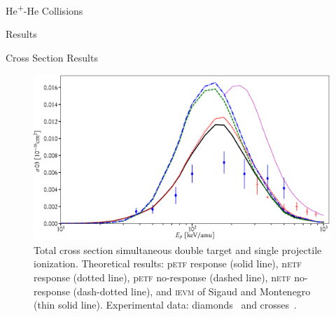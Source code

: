 \documentclass[a5paper, 9 pt]{extreport}
\begin{document}
\begin{chapter}{\texorpdfstring{He\textsuperscript{+}}{He+}-He Collisions \label{chap:hephe}}
\begin{section}{Results \label{sec:hephe-disc}}
\begin{subsection}{Cross Section Results \label{sec:hephe-res}}
         \begin{figure}[t]
            \centering
            \includegraphics[width = \linewidth]{./images/hephe-cross/HepHe-003.eps}
            \caption[Total cross section simultaneous double target and single projectile ionization in
                     He\textsuperscript{+}-He collisions.]
                    {Total cross section simultaneous double target and single projectile ionization.
                     Theoretical results: p\textsc{etf} response (solid line), n\textsc{etf} response
                                          (dotted line), p\textsc{etf} no-response (dashed line),
                                          n\textsc{etf} no-response (dash-dotted line), and
                                          \textsc{ievm} of Sigaud and Montenegro~\cite{SM-03} (thin
                                          solid line).
                     Experimental data: diamonds~\cite{Dub-89} and crosses~\cite{SSMSM-11}.
                     \label{fig:cs003}}
         \end{figure}


\end{subsection}
\end{section}
\end{chapter}
\end{document}

